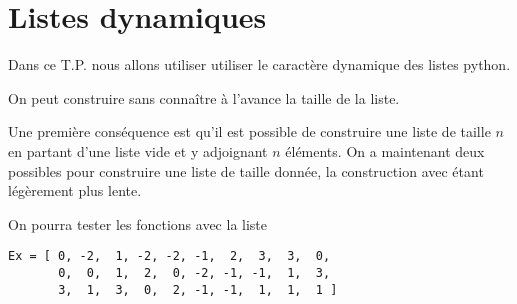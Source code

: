 \chapter{Listes dynamiques}
\thispagestyle{empty}

\vskip -2cm
{\sf Dans ce T.P. nous allons utiliser utiliser le caractère dynamique des listes python.

On peut construire sans connaître à l'avance la taille de la liste.

Une première conséquence est qu'il est possible de construire une liste de taille $n$ en partant d'une liste vide et y adjoignant $n$ éléments. On a maintenant deux possibles pour construire une liste de taille donnée, la construction avec  étant légèrement plus lente.

On pourra tester les fonctions avec la liste 
\begin{lstlisting}
Ex = [ 0, -2,  1, -2, -2, -1,  2,  3,  3,  0,
       0,  0,  1,  2,  0, -2, -1, -1,  1,  3,
       3,  1,  3,  0,  2, -1, -1,  1,  1,  1 ]
\end{lstlisting}
}
